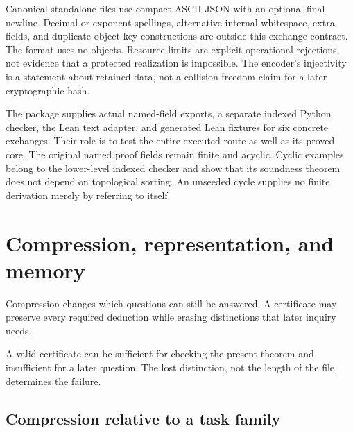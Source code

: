 Canonical standalone files use compact ASCII JSON with an optional final newline. Decimal or exponent spellings, alternative internal whitespace, extra fields, and duplicate object-key constructions are outside this exchange contract. The format uses no objects. Resource limits are explicit operational rejections, not evidence that a protected realization is impossible. The encoder's injectivity is a statement about retained data, not a collision-freedom claim for a later cryptographic hash.

The package supplies actual named-field exports, a separate indexed Python checker, the Lean text adapter, and generated Lean fixtures for six concrete exchanges. Their role is to test the entire executed route as well as its proved core. The original named proof fields remain finite and acyclic. Cyclic examples belong to the lower-level indexed checker and show that its soundness theorem does not depend on topological sorting. An unseeded cycle supplies no finite derivation merely by referring to itself.



\chapter{Compression, representation, and memory}\label{PPT:book:chapter-52}
Compression changes which questions can still be answered. A certificate may preserve every required deduction while erasing distinctions that later inquiry needs.

  \par
  A valid certificate can be sufficient for checking the present theorem and insufficient for a later question. The lost distinction, not the length of the file, determines the failure.
 


\section{Compression relative to a task family}
\label{PPT:sec:old7}

